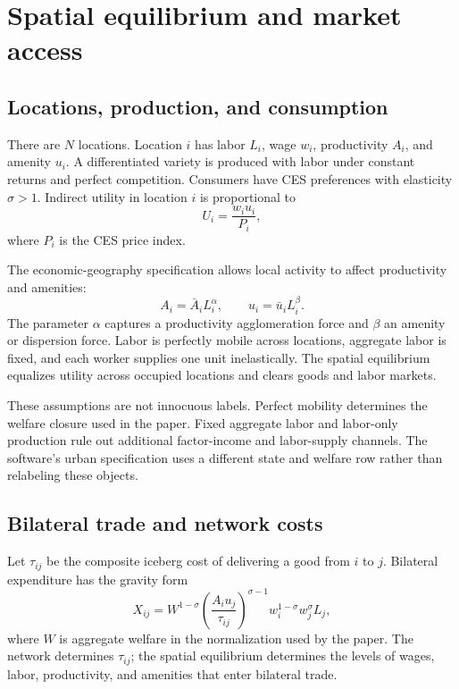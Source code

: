 \chapter{Spatial equilibrium and market access}
\label{ch:equilibrium}

\section{Locations, production, and consumption}

There are \(N\) locations. Location \(i\) has labor \(L_i\), wage \(w_i\),
productivity \(A_i\), and amenity \(u_i\). A differentiated variety is produced
with labor under constant returns and perfect competition. Consumers have CES
preferences with elasticity \(\sigma>1\). Indirect utility in location \(i\)
is proportional to
\[
  U_i=\frac{w_i u_i}{P_i},
\]
where \(P_i\) is the CES price index.

The economic-geography specification allows local activity to affect
productivity and amenities:
\[
  A_i=\bar A_i L_i^\alpha,
  \qquad
  u_i=\bar u_i L_i^\beta.
\]
The parameter \(\alpha\) captures a productivity agglomeration force and
\(\beta\) an amenity or dispersion force. Labor is perfectly mobile across
locations, aggregate labor is fixed, and each worker supplies one unit
inelastically. The spatial equilibrium equalizes utility across occupied
locations and clears goods and labor markets.

These assumptions are not innocuous labels. Perfect mobility determines the
welfare closure used in the paper. Fixed aggregate labor and labor-only
production rule out additional factor-income and labor-supply channels. The
software's urban specification uses a different state and welfare row rather
than relabeling these objects.

\section{Bilateral trade and network costs}

Let \(\tau_{ij}\) be the composite iceberg cost of delivering a good from
\(i\) to \(j\). Bilateral expenditure has the gravity form
\[
 X_{ij}
 =W^{1-\sigma}
 \left(\frac{A_i u_j}{\tau_{ij}}\right)^{\sigma-1}
 w_i^{1-\sigma}w_j^\sigma L_j,
\]
where \(W\) is aggregate welfare in the normalization used by the paper. The
network determines \(\tau_{ij}\); the spatial equilibrium determines the
levels of wages, labor, productivity, and amenities that enter bilateral
trade.


